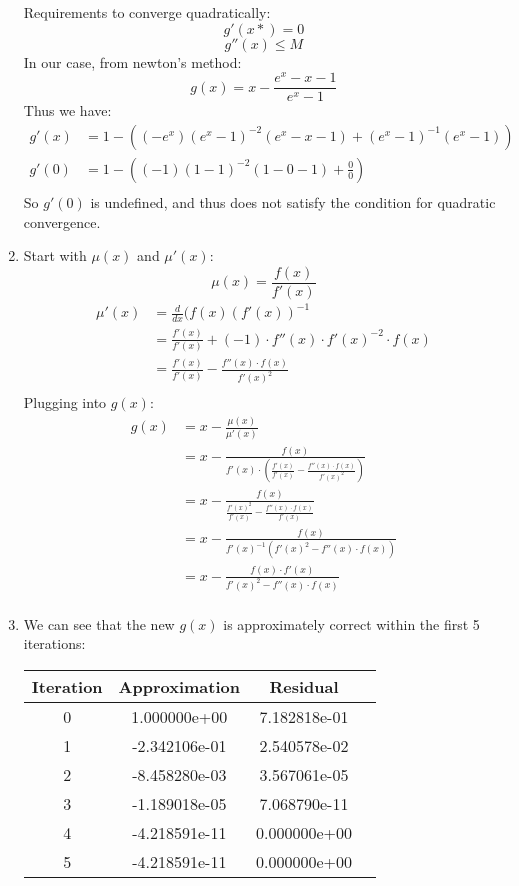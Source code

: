 \documentclass{article}
\begin{document}
\begin{enumerate}[label=\alph*.)]
Requirements to converge quadratically: \\
\[
g'(x*) = 0
\]
\[
g''(x) \leq M
\]
In our case, from newton's method: \\
\[
g(x) = x - \frac{e^x - x - 1}{e^x - 1}
\]
Thus we have:
\begin{align*}
g'(x) &= 1 - ((-e^x)(e^x-1)^{-2}(e^x-x-1) + (e^x - 1)^{-1}(e^x - 1)) \\
g'(0) &= 1 - ((-1)(1-1)^{-2}(1-0 - 1) + \frac{0}{0}) \\
\end{align*}
So $g'(0)$ is undefined, and thus does not satisfy the condition for quadratic convergence. \\
\item Start with $\mu(x)$ and $\mu'(x)$:
\[
\mu(x) = \frac{f(x)}{f'(x)}
\]
\begin{align*}
\mu'(x) &=\frac{d}{dx}(f(x)(f'(x))^{-1} \\
&= \frac{f'(x)}{f'(x)} + (-1)\cdot f''(x) \cdot f'(x)^{-2} \cdot f(x) \\
&= \frac{f'(x)}{f'(x)} - \frac{f''(x) \cdot f(x)}{f'(x)^2}\\
\end{align*}
Plugging into $g(x)$: \\
\begin{align*}
g(x) &= x - \frac{\mu(x)}{\mu'(x)} \\
&= x - \frac{f(x)}{f'(x) \cdot ( \frac{f'(x)}{f'(x)} - \frac{f''(x) \cdot f(x)}{f'(x)^2})}\\
&= x - \frac{f(x)}{\frac{f'(x)^2}{f'(x)} - \frac{f''(x) \cdot f(x)}{f'(x)}} \\
&=  x - \frac{f(x)}{f'(x)^{-1}(f'(x)^2 - f''(x) \cdot f(x))} \\
&= x - \frac{f(x) \cdot f'(x)}{f'(x)^2 - f''(x) \cdot f(x)} \\
\end{align*}
\item We can see that the new $g(x)$ is approximately correct within the first 5 iterations: \\
\begin{tabular}{|c|c|c|c|}
\hline
Iteration & Approximation & Residual\\
\hline
0 & 1.000000e+00 & 7.182818e-01\\
\hline
1 & -2.342106e-01 & 2.540578e-02\\
\hline
2 & -8.458280e-03 & 3.567061e-05\\
\hline
3 & -1.189018e-05 & 7.068790e-11\\
\hline
4 & -4.218591e-11 & 0.000000e+00\\
\hline
5 & -4.218591e-11 & 0.000000e+00\\
\hline
\end{tabular}
\end{enumerate}
\end{document}

